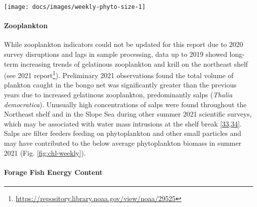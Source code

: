 \documentclass[
  10pt,
]{article}
\let\origfigure\figure
\let\endorigfigure\endfigure
\renewenvironment{figure}[1][2] {
    \expandafter\origfigure\expandafter[H]
} {
    \endorigfigure
}
\begin{document}
\begin{figure}

{\centering \texttt{[image: docs/images/weekly-phyto-size-1]} 

}

\caption{The annual climatology (1998-2020) percent composition of the phytoplankton size classes in the Mid-Atlantic based on satellite observations in the shaded portions.  The 2021 proportions for the microplankton (>20 microns, green) and nanoplankton (2-20 microns, orange) are shown in the bold lines.}\label{fig:weekly-phyto-size}
\end{figure}

\hypertarget{zooplankton}{%
\paragraph{Zooplankton}\label{zooplankton}}

While zooplankton indicators could not be updated for this report due to
2020 survey disruptions and lags in sample processing, data up to 2019
showed long-term increasing trends of gelatinous zooplankton and krill
on the northeast shelf (see 2021 report\footnote{\url{https://repository.library.noaa.gov/view/noaa/29525}}).
Preliminary 2021 observations found the total volume of plankton caught
in the bongo net was significantly greater than the previous years due
to increased gelatinous zooplankton, predominantly salps (\emph{Thalia
democratica}). Unusually high concentrations of salps were found
throughout the Northeast shelf and in the Slope Sea during other summer
2021 scientific surveys, which may be associated with water mass
intrusions at the shelf break
{[}\protect\hyperlink{ref-madin_periodic_2006}{33},\protect\hyperlink{ref-deibel_predictability_2009}{34}{]}.
Salps are filter feeders feeding on phytoplankton and other small
particles and may have contributed to the below average phytoplankton
biomass in summer 2021 (Fig. \ref{fig:chl-weekly}).

\hypertarget{forage-fish-energy-content}{%
\paragraph{Forage Fish Energy
Content}\label{forage-fish-energy-content}}
\end{document}
